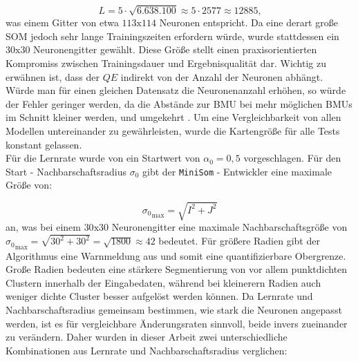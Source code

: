 \begin{equation}
    L = 5 \cdot \sqrt{6.638.100} \approx 5 \cdot 2577 \approx 12885\text{,}
\end{equation}
was einem Gitter von etwa $113 \text{x} 114$ Neuronen entspricht. Da eine derart große SOM jedoch sehr lange Trainingszeiten erfordern würde, wurde stattdessen ein $30 \text{x} 30$ Neuronengitter gewählt. Diese Größe stellt einen praxisorientierten Kompromiss zwischen Trainingsdauer und Ergebnisqualität dar. Wichtig zu erwähnen ist, dass der $QE$ indirekt von der Anzahl der Neuronen abhängt. Würde man für einen gleichen Datensatz die Neuronenanzahl erhöhen, so würde der Fehler geringer werden, da die Abstände zur BMU bei mehr möglichen BMUs im Schnitt kleiner werden, und umgekehrt \parencite{polzlbauer_survey_2004}. Um eine Vergleichbarkeit von allen Modellen untereinander zu gewährleisten, wurde die Kartengröße für alle Tests konstant gelassen. \\
Für die Lernrate wurde von \textcite{vettigli_minisom_2021} ein Startwert von  $\alpha_0 = 0,5$ vorgeschlagen. Für den Start - Nachbarschaftsradius $\sigma_0$ gibt der \texttt{MiniSom} - Entwickler eine maximale Größe von:

\begin{equation}
    {\sigma_0}_{\text{max}} = \sqrt{I^2 + J^2}
\end{equation}
an, was bei einem $30 \text{x} 30$ Neuronengitter eine maximale Nachbarschaftsgröße von ${\sigma_0}_{\text{max}} = \sqrt{30^2 + 30^2} = \sqrt{1800} \approx 42$ bedeutet. Für größere Radien gibt der Algorithmus eine Warnmeldung aus und somit eine quantifizierbare Obergrenze. \\
Große Radien bedeuten eine stärkere Segmentierung von vor allem punktdichten Clustern innerhalb der Eingabedaten, während bei kleinerern Radien auch weniger dichte Cluster besser aufgelöst werden können. Da Lernrate und Nachbarschaftsradius gemeinsam bestimmen, wie stark die Neuronen angepasst werden, ist es für vergleichbare Änderungsraten sinnvoll, beide invers zueinander zu verändern. Daher wurden in dieser Arbeit zwei unterschiedliche Kombinationen aus Lernrate und Nachbarschaftsradius verglichen:

